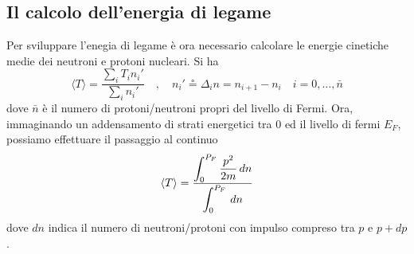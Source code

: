 \subsection{Il calcolo dell'energia di legame}\label{sec:calcolo-energia-legame-fermions-gas}

Per sviluppare l'enegia di legame è ora necessario calcolare le energie cinetiche medie dei neutroni e protoni nucleari.
Si ha
\[
\langle T \rangle = \frac{\sum_{i}T_{i}n_{i}'}{\sum_{i}n_{i}'} \quad , \quad n_{i}' \circeq \Delta_{i}n = n_{i+1}- n_{i} \quad
i = 0, \dots, \bar{n}
\]
dove $\bar{n}$ è il numero di protoni/neutroni propri del livello di Fermi.
Ora, immaginando un addensamento di strati energetici tra $0$ ed il livello di fermi $E_{F}$, possiamo effettuare il passaggio al continuo
\begin{equation}
	\langle T \rangle = \fraclarg{\int_{0}^{P_{F}} \frac{p^{2}}{2m} \, dn}{\int_{0}^{P_{F}}  \, dn }
	\label{eq:average-kinetic-energy-nucleons}
\end{equation}
dove $dn$ indica il numero di neutroni/protoni con impulso compreso tra $p$ e $p+dp$.

